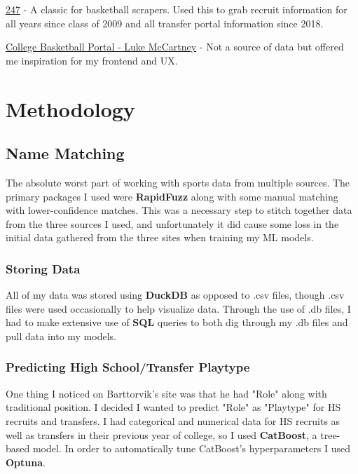 \documentclass[11pt]{article}
\begin{document}
\href{https://247sports.com/college/basketball/recruiting/}{247} - A classic for basketball scrapers. Used this to grab recruit information for all years since class of 2009 and all transfer portal information since 2018.

\href{https://collegebasketballportal.com/}{College Basketball Portal - Luke McCartney} - Not a source of data but offered me inspiration for my frontend and UX.


\section{Methodology}

\subsection{Name Matching}

The absolute worst part of working with sports data from multiple sources. The primary packages I used were \textbf{RapidFuzz} along with some manual matching with lower-confidence matches. This was a necessary step to stitch together data from the three sources I used, and unfortunately it did cause some loss in the initial data gathered from the three sites when training my ML models.

\subsubsection{Storing Data}

All of my data was stored using \textbf{DuckDB} as opposed to .csv files, though .csv files were used occasionally to help visualize data. Through the use of .db files, I had to make extensive use of \textbf{SQL} queries to both dig through my .db files and pull data into my models.

\subsubsection{Predicting High School/Transfer Playtype}

One thing I noticed on Barttorvik's site was that he had "Role" along with traditional position. I decided I wanted to predict "Role" as "Playtype" for HS recruits and transfers. I had categorical and numerical data for HS recruits as well as transfers in their previous year of college, so I used \textbf{CatBoost}, a tree-based model. In order to automatically tune CatBoost's hyperparameters I used \textbf{Optuna}.
\end{document}
